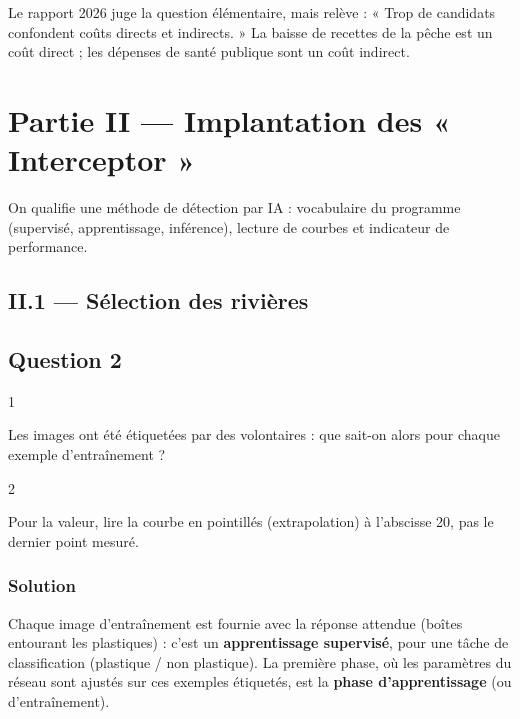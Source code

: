 \documentclass[11pt,a4paper]{article}
\begin{document}
\begin{jury}

Le rapport 2026 juge la question élémentaire, mais relève : « Trop de candidats confondent coûts directs et indirects. » La baisse de recettes de la pêche est un coût direct ; les dépenses de santé publique sont un coût indirect.

\end{jury}

\hypertarget{partie-ii-implantation-des-interceptor}{%
\section{Partie II --- Implantation des « Interceptor »}\label{partie-ii-implantation-des-interceptor}}

On qualifie une méthode de détection par IA : vocabulaire du programme (supervisé, apprentissage, inférence), lecture de courbes et indicateur de performance.

\hypertarget{ii.1-suxe9lection-des-riviuxe8res}{%
\subsection{II.1 --- Sélection des rivières}\label{ii.1-suxe9lection-des-riviuxe8res}}

\hypertarget{question-2}{%
\subsection{Question 2}\label{question-2}}

\begin{indication}{1}

Les images ont été étiquetées par des volontaires : que sait-on alors pour chaque exemple d'entraînement ?

\end{indication}

\begin{indication}{2}

Pour la valeur, lire la courbe en pointillés (extrapolation) à l'abscisse 20, pas le dernier point mesuré.

\end{indication}

\hypertarget{solution-1}{%
\subsubsection{Solution}\label{solution-1}}

Chaque image d'entraînement est fournie avec la réponse attendue (boîtes entourant les plastiques) : c'est un \textbf{apprentissage supervisé}, pour une tâche de classification (plastique / non plastique). La première phase, où les paramètres du réseau sont ajustés sur ces exemples étiquetés, est la \textbf{phase d'apprentissage} (ou d'entraînement).
\end{document}

